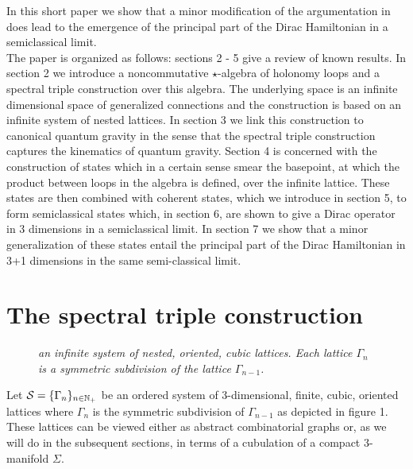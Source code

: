 \documentclass[12pt]{article}
\def\G{\Gamma}
\def\cs{{\cal S}}
\begin{document}
In this short paper we show that a minor modification of the argumentation in \cite{Aastrup:2010kb} does lead to the emergence of the principal part of the Dirac Hamiltonian in a semiclassical limit.  \\


The paper is organized as follows: sections 2 - 5 give a review of known results. In section 2 we introduce a noncommutative $\star$-algebra of holonomy loops and a spectral triple construction over this algebra. The underlying space is an infinite dimensional space of generalized connections and the construction is based on an infinite system of nested lattices. In section 3 we link this construction to canonical quantum gravity in the sense that the spectral triple construction captures the kinematics of quantum gravity. Section 4 is concerned with the construction of states which in a certain sense smear the basepoint, at which the product between loops in the algebra is defined, over the infinite lattice. These states are then combined with coherent states, which we introduce in section 5, to form semiclassical states which, in section 6, are shown to give a Dirac operator in 3 dimensions in a semiclassical limit. In section 7 we show that a minor generalization of these states entail the principal part of the Dirac Hamiltonian in 3+1 dimensions in the same semi-classical limit.


\section{The spectral triple construction}

\begin{figure}[t]
\begin{center}
\resizebox{!}{2cm}{
 }
\end{center}
\caption{\it an infinite system of nested, oriented, cubic lattices. Each lattice $\G_n$ is a symmetric subdivision of the lattice $\G_{n-1}$.}
\end{figure}

Let $\cs=\{\G_n\}_{n\in\mathbb{N}_+}$ be an ordered system of 3-dimensional, finite, cubic, oriented lattices where $\G_n$ is the symmetric subdivision of $\G_{n-1}$ as depicted in figure 1. 
These lattices can be viewed either as abstract combinatorial graphs or, as we will do in the subsequent sections, in terms of a cubulation of a compact 3-manifold $\Sigma$.
\end{document}

